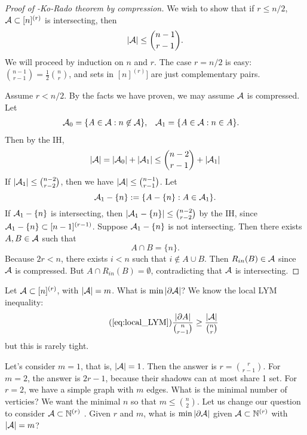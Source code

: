 \begin{proof}[Proof of \erdos-Ko-Rado theorem by compression]
We wish to show that if $r\leq n/2$, $\mathcal{A}\subset [n]^{(r)}$ is intersecting, then
\[
|\mathcal{A}| \leq {n-1 \choose r-1}.
\]
We will proceed by induction on $n$ and $r$. The case $r=n/2$ is easy: ${n-1\choose r-1} = \frac{1}{2}{n\choose r}$, and sets in $[n]^{(r)}]$ are just complementary pairs.

Assume $r<n/2$. By the facts we have proven, we may assume $\mathcal{A}$ is compressed. Let
\begin{align*}
\mathcal{A}_0 &= \{A\in \mathcal{A}: n\not\in \mathcal{A}\}, & \mathcal{A}_1 &= \{A\in \mathcal{A}: n\in A\}.
\end{align*}
Then by the IH,
\[
|\mathcal{A}| = |\mathcal{A}_0| + |\mathcal{A}_1| \leq {n-2 \choose r-1} + |\mathcal{A}_1|
\]
If $|\mathcal{A}_1| \leq {n-2 \choose r-2}$, then we have $|\mathcal{A}| \leq {n-1\choose r-1}$.
Let 
\[
\mathcal{A}_1 - \{n\} := \{A-\{n\}: A\in \mathcal{A}_1\}.
\]
 If $\mathcal{A}_1- \{n\}$ is intersecting, then $|\mathcal{A}_1- \{n\}| \leq {n-2 \choose r-2}$ by the IH, since $\mathcal{A}_1- \{n\} \subset [n-1]^{(r-1)}$. 
Suppose $\mathcal{A}_1- \{n\}$ is not intersecting. Then there exists $A,B\in \mathcal{A}$ such that 
\[
A\cap B = \{n\}.
\]
Because $2r<n$, there exists $i<n$ such that $i\not \in A\cup B$. Then $R_{in}(B) \in \mathcal{A}$ since $\mathcal{A}$ is compressed.
But $A\cap R_{in}(B) = \emptyset$, contradicting that $\mathcal{A}$ is intersecting. 
\end{proof}

Let $\mathcal{A}\subset [n]^{(r)}$, with $|\mathcal{A}| = m$. What is $\min |\partial \mathcal{A}|$? 
We know the local LYM inequality:
\begin{equation*}	\tag{\cref{eq:local_LYM}}
\frac{|\partial A|}{{n\choose r-1}}\geq \frac{|\A|}{{n\choose r}}
\end{equation*}
but this is rarely tight.

Let's consider $m=1$, that is, $|\mathcal{A}|=1$. Then the answer is $r= {r\choose r-1}$. For $m=2$, the answer is $2r-1$, because their shadows can at most share 1 set.
For $r=2$, we have a simple graph with $m$ edges. What is the minimal number of verticies? We want the minimal $n$ so that $m\leq {n \choose 2}$.
Let us change our question to consider $\mathcal{A}\subset \mathbb{N}^{(r)}$ . Given $r$ and $m$, what is $\min |\partial \mathcal{A}|$ given $\mathcal{A}\subset \mathbb{N}^{(r)}$ with $|\mathcal{A}| = m$?

